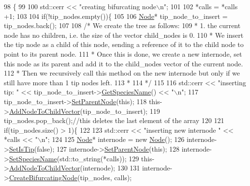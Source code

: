 \begin{DoxyCode}
98                                                                       \{
99   
100   std::cerr << \textcolor{stringliteral}{"creating bifurcating node\(\backslash\)n"};
101   
102   *calls = *calls +1;
103   
104   \textcolor{keywordflow}{if}(!tip\_nodes.empty())\{
105     
106     \hyperlink{classNode}{Node}* tip\_node\_to\_insert = tip\_nodes.back();
107         
108     \textcolor{comment}{/* We create the tree as follows:}
109 \textcolor{comment}{     * 1. the current node has no children, i.e. the size of the vector child\_nodes is 0.}
110 \textcolor{comment}{     * We insert the tip node as a child of this node, sending a reference of it to the child node to point
       to its parent node.}
111 \textcolor{comment}{     * Once this is done, we create a new internode, set this node as its parent and add it to the
       child\_nodes vector of the current node.}
112 \textcolor{comment}{     * Then we recursively call this method on the new internode but only if we still have more than 1 tip
       nodes left.}
113 \textcolor{comment}{     * }
114 \textcolor{comment}{     */}
115     
116     std::cerr << \textcolor{stringliteral}{"inserting tip: "} << tip\_node\_to\_insert->\hyperlink{classNode_a9787fabf589f2b0764482b41091f775b}{GetSpeciesName}() << \textcolor{stringliteral}{"\(\backslash\)n"};
117     tip\_node\_to\_insert->\hyperlink{classNode_acb22b8f28ca70e1316a6bafc375ee352}{SetParentNode}(\textcolor{keyword}{this});
118     this->\hyperlink{classNode_aef73af92aa3046218f83ed67a7996188}{AddNodeToChildVector}(tip\_node\_to\_insert);
119     tip\_nodes.pop\_back();\textcolor{comment}{//this deletes the last element of the array}
120     
121     \textcolor{keywordflow}{if}(tip\_nodes.size() > 1)\{
122       
123       std::cerr << \textcolor{stringliteral}{"inserting new internode "} << *calls << \textcolor{stringliteral}{"\(\backslash\)n"};
124       
125       \hyperlink{classNode}{Node}* internode = \textcolor{keyword}{new} \hyperlink{classNode_ad7a34779cad45d997bfd6d3d8043c75f}{Node}();
126       internode->\hyperlink{classNode_a89bff92e3930d521439395ccf332418f}{SetIsTip}(\textcolor{keyword}{false});
127       internode->\hyperlink{classNode_acb22b8f28ca70e1316a6bafc375ee352}{SetParentNode}(\textcolor{keyword}{this});
128       internode->\hyperlink{classNode_af4ba012237c10c42f2118e629633b844}{SetSpeciesName}(std::to\_string(*calls));
129       this->\hyperlink{classNode_aef73af92aa3046218f83ed67a7996188}{AddNodeToChildVector}(internode);
130     
131       internode->\hyperlink{classNode_a73e4640e16847b3c1b655930c193d03b}{CreateBifurcatingNode}(tip\_nodes, calls);

\end{DoxyCode}
